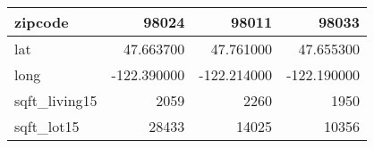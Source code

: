 \begin{table}[H]
\begin{tabular}{|l|r|r|r|}
\hline zipcode & \cellcolor[rgb]{0.9, 0.54, 0.52} 98024 & 98011 & 98033 \\
\hline lat & \cellcolor[rgb]{0.9, 0.54, 0.52} 47.663700 & 47.761000 & 47.655300 \\
\hline long & \cellcolor[rgb]{0.9, 0.54, 0.52} -122.390000 & \cellcolor[rgb]{0.9, 0.54, 0.52} -122.214000 & \cellcolor[rgb]{0.9, 0.54, 0.52} -122.190000 \\
\hline sqft\_living15 & \cellcolor[rgb]{0.9, 0.54, 0.52} 2059 & 2260 & 1950 \\
\hline sqft\_lot15 & \cellcolor[rgb]{0.9, 0.54, 0.52} 28433 & 14025 & 10356 \\
\hline
\end{tabular}
\end{table}
